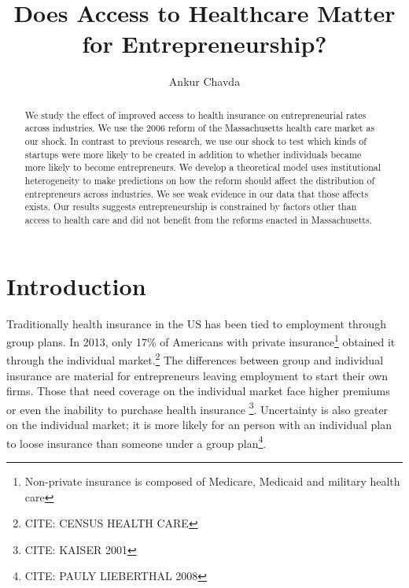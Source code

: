 \documentclass[12pt]{article}
\title{Does Access to Healthcare Matter for Entrepreneurship?}
\author{Ankur Chavda}
\begin{document}
\maketitle

\begin{abstract}
We study the effect of improved access to health insurance on entrepreneurial rates across industries. We use the 2006 reform of the Massachusetts health care market as our shock. In contrast to previous research, we use our shock to test which kinds of startups were more likely to be created in addition to whether individuals became more likely to become entrepreneurs.  We develop a theoretical model uses institutional heterogeneity to make predictions on how the reform should affect the distribution of entrepreneurs across industries. We see weak evidence in our data that those affects exists. Our results suggests entrepreneurship is constrained by factors other than access to health care and did not benefit from the reforms enacted in Massachusetts. 
\end{abstract}


\begin{comment}

freelancers not interesting per se but cases where they grow into growth startups do exist (GetHarvest). 

check to make sure model (4) is referred to as being MA only

check law journals for massachusetts health care papers

\end{comment}


\section{Introduction}
Traditionally health insurance in the US has been tied to employment through group plans. In 2013, only 17\% of Americans with private insurance\footnote{Non-private insurance is composed of Medicare, Medicaid and military health care} obtained it through the individual market.\footnote{CITE: CENSUS HEALTH CARE} The differences between group and individual insurance are material for entrepreneurs leaving employment to start their own firms. Those that need coverage on the individual market face higher premiums or even the inability to purchase health insurance \footnote{CITE: KAISER 2001}. Uncertainty is also greater on the individual market; it is more likely for an person with an individual plan to loose insurance than someone under a group plan\footnote{CITE: PAULY LIEBERTHAL 2008}. 
\end{document}
